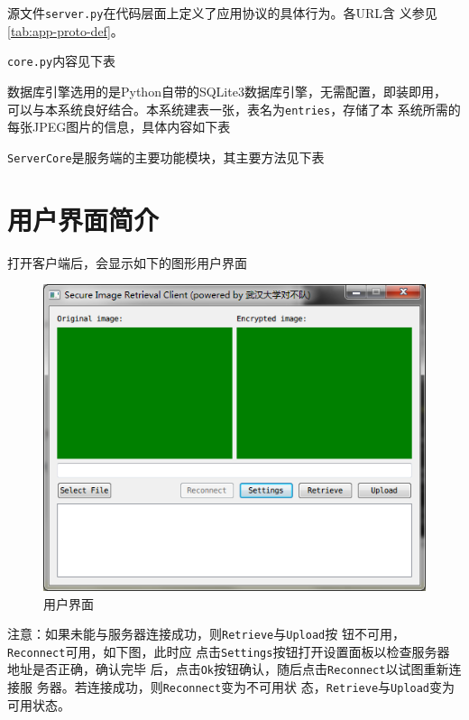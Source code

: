 源文件\texttt{server.py}在代码层面上定义了应用协议的具体行为。各URL含
义参见\ref{tab:app-proto-def}。

\texttt{core.py}内容见下表


数据库引擎选用的是Python自带的SQLite3数据库引擎，无需配置，即装即用，
可以与本系统良好结合。本系统建表一张，表名为\texttt{entries}，存储了本
系统所需的每张JPEG图片的信息，具体内容如下表


\texttt{ServerCore}是服务端的主要功能模块，其主要方法见下表


\section{用户界面简介}
\label{sec:ui-intro}

打开客户端后，会显示如下的图形用户界面
\begin{figure}[H]\centering
  \includegraphics[keepaspectratio=true]{images/ui-connected.png}
  \caption{用户界面}
\label{fig:ui-connected}
\end{figure}

注意：如果未能与服务器连接成功，则\texttt{Retrieve}与\texttt{Upload}按
钮不可用，\texttt{Reconnect}可用，如下图，此时应
点击\texttt{Settings}按钮打开设置面板以检查服务器地址是否正确，确认完毕
后，点击\texttt{Ok}按钮确认，随后点击\texttt{Reconnect}以试图重新连接服
务器。若连接成功，则\texttt{Reconnect}变为不可用状
态，\texttt{Retrieve}与\texttt{Upload}变为可用状态。

